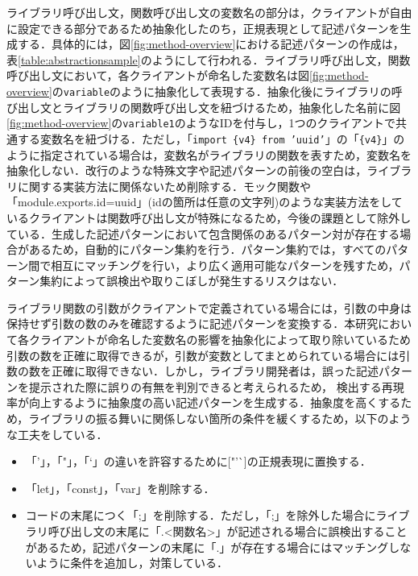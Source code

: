 \documentclass[11pt]{jreport}
\begin{document}
ライブラリ呼び出し文，関数呼び出し文の変数名の部分は，クライアントが自由に設定できる部分であるため抽象化したのち，正規表現として記述パターンを生成する．具体的には，図\ref{fig:method-overview}における記述パターンの作成は，表\ref{table:abstractionsample}のようにして行われる．ライブラリ呼び出し文，関数呼び出し文において，各クライアントが命名した変数名は図\ref{fig:method-overview}の\texttt{variable}のように抽象化して表現する．抽象化後にライブラリの呼び出し文とライブラリの関数呼び出し文を紐づけるため，抽象化した名前に図\ref{fig:method-overview}の\texttt{variable1}のようなIDを付与し，1つのクライアントで共通する変数名を紐づける．ただし，「\texttt{import \{v4\} from 'uuid'}」の「\texttt{\{v4\}}」のように指定されている場合は，変数名がライブラリの関数を表すため，変数名を抽象化しない．改行のような特殊文字や記述パターンの前後の空白は，ライブラリに関する実装方法に関係ないため削除する．モック関数や「module.exports.id=uuid」(idの箇所は任意の文字列)のような実装方法をしているクライアントは関数呼び出し文が特殊になるため，今後の課題として除外している．生成した記述パターンにおいて包含関係のあるパターン対が存在する場合があるため，自動的にパターン集約を行う．パターン集約では，すべてのパターン間で相互にマッチングを行い，より広く適用可能なパターンを残すため，パターン集約によって誤検出や取りこぼしが発生するリスクはない．

ライブラリ関数の引数がクライアントで定義されている場合には，引数の中身は保持せず引数の数のみを確認するように記述パターンを変換する．本研究において各クライアントが命名した変数名の影響を抽象化によって取り除いているため引数の数を正確に取得できるが，引数が変数としてまとめられている場合には引数の数を正確に取得できない．しかし，ライブラリ開発者は，誤った記述パターンを提示された際に誤りの有無を判別できると考えられるため，
検出する再現率が向上するように抽象度の高い記述パターンを生成する．抽象度を高くするため，ライブラリの振る舞いに関係しない箇所の条件を緩くするため，以下のような工夫をしている．

\begin{itemize}
\item 「'」，「"」，「`」の違いを許容するために["'\`{}]の正規表現に置換する．
\item 「let」，「const」，「var」を削除する．
\item コードの末尾につく「;」を削除する．ただし，「;」を除外した場合にライブラリ呼び出し文の末尾に「.\textless{}関数名\textgreater{}」が記述される場合に誤検出することがあるため，記述パターンの末尾に「.」が存在する場合にはマッチングしないように条件を追加し，対策している．
\end{itemize}
\end{document}
